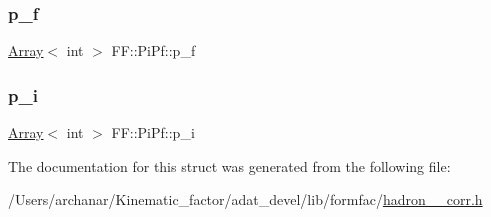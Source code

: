 \subsubsection{\texorpdfstring{p\_f}{p\_f}}
{\footnotesize\ttfamily \mbox{\hyperlink{classXMLArray_1_1Array}{Array}}$<$ int $>$ F\+F\+::\+Pi\+Pf\+::p\+\_\+f}

\mbox{\label{structFF_1_1PiPf_a740b500d8919567a75f3b1d1cb83241f}} 
\subsubsection{\texorpdfstring{p\_i}{p\_i}}
{\footnotesize\ttfamily \mbox{\hyperlink{classXMLArray_1_1Array}{Array}}$<$ int $>$ F\+F\+::\+Pi\+Pf\+::p\+\_\+i}



The documentation for this struct was generated from the following file\+:\begin{DoxyCompactItemize}
\item 
/\+Users/archanar/\+Kinematic\+\_\+factor/adat\+\_\+devel/lib/formfac/\mbox{\hyperlink{lib_2formfac_2hadron__3pt__corr_8h}{hadron\+\_\+3pt\+\_\+corr.\+h}}\end{DoxyCompactItemize}
